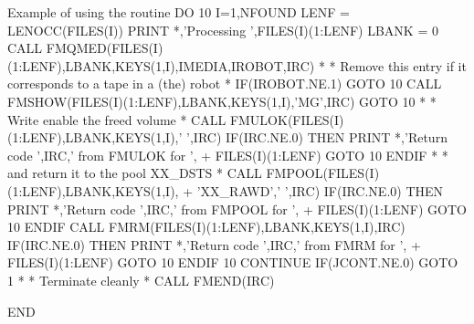 \begin{XMPt}{Example of using the routine \protect{}}
      DO 10 I=1,NFOUND                                            
      LENF = LENOCC(FILES(I))                                           
      PRINT *,'Processing ',FILES(I)(1:LENF)                            
      LBANK = 0                                                         
      CALL FMQMED(FILES(I)(1:LENF),LBANK,KEYS(1,I),IMEDIA,IROBOT,IRC)   
*
*     Remove this entry if it corresponds to a tape in a (the) robot
*
      IF(IROBOT.NE.1) GOTO 10                                           
      CALL FMSHOW(FILES(I)(1:LENF),LBANK,KEYS(1,I),'MG',IRC)            
      GOTO 10                                                     
*
*     Write enable the freed volume
*
      CALL FMULOK(FILES(I)(1:LENF),LBANK,KEYS(1,I),' ',IRC)             
      IF(IRC.NE.0) THEN                                                 
         PRINT *,'Return code ',IRC,' from FMULOK for ',                
     +   FILES(I)(1:LENF)                                               
         GOTO 10                                                        
      ENDIF                                                             
*
*     and return it to the pool XX_DSTS
*
      CALL FMPOOL(FILES(I)(1:LENF),LBANK,KEYS(1,I),                     
     +            'XX_RAWD',' ',IRC)                                    
      IF(IRC.NE.0) THEN                                                 
         PRINT *,'Return code ',IRC,' from FMPOOL for ',                
     +   FILES(I)(1:LENF)                                               
         GOTO 10                                                        
      ENDIF                                                             
      CALL FMRM(FILES(I)(1:LENF),LBANK,KEYS(1,I),IRC)                   
      IF(IRC.NE.0) THEN                                                 
         PRINT *,'Return code ',IRC,' from FMRM for ',                  
     +   FILES(I)(1:LENF)                                               
         GOTO 10                                                        
      ENDIF                                                             
10    CONTINUE                                                          
      IF(JCONT.NE.0) GOTO 1                                             
*                                                                       
*     Terminate cleanly                                                 
*                                                                       
      CALL FMEND(IRC)                                                   
                                                                        
      END                                                               
\end{XMPt}


